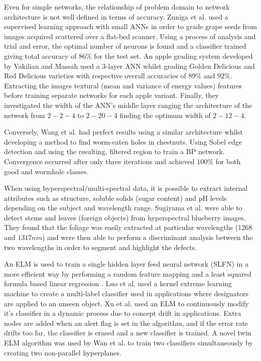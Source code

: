 \documentclass[fleqn,twoside,12pt]{report}
\begin{document}
Even for simple networks, the relationship of problem domain to network architecture is not well defined in terms of accuracy. Zuniga et al.\cite{zuniga} used a supervised learning approach with small ANNs in order to grade grape seeds from images acquired scattered over a flat-bed scanner. Using a process of analysis and trial and error, the optimal number of neurons is found and a classifier trained giving total accuracy of $86\%$ for the test set. An apple grading system developed by Vakilian and Massah \cite{vakilian} used a 3-layer ANN whilst grading Golden Delicious and Red Delicious varieties with respective overall accuracies of $89\%$ and $92\%$. Extracting the images textural (mean and variance of energy values) features before training separate networks for each apple variant. Finally, they investigated the width of the ANN's middle layer ranging the architecture of the network from $2-2-4$ to $2-20-4$ finding the optimum width of $2-12-4$. 

Conversely, Wang et al.\cite{wang} had perfect results using a similar architecture whilst developing a method to find worm-eaten holes in chestnuts. Using Sobel edge detection and using the resulting, filtered region to train a BP network. Convergence occurred after only three iterations and achieved $100\%$ for both good and wormhole classes.

When using hyperspectral/multi-spectral data, it is possible to extract internal attributes such as structure, soluble solids (sugar content) and pH levels depending on the subject and wavelength range. Sugiyama et al.\cite{sugiyama} were able to detect stems and leaves (foreign objects) from hyperspectral blueberry images. They found that the foliage was easily extracted at particular wavelengths (1268 and $1317nm$) and were then able to perform a discriminant analysis between the two wavelengths in order to segment and highlight the defects.

An ELM is used to train a single hidden layer feed neural network (SLFN) in a more efficient way by performing a random feature mapping and a least squared formula based linear regression \cite{peng}. Luo et al.\cite{luo} used a kernel extreme learning machine to create a multi-label classifier used in applications where designators are applied to an unseen object. Xu et al.\cite{xu} used an ELM to continuously modify it's classifier in a dynamic process due to concept drift in applications. Extra nodes are added when an alert flag is set in the algorithm, and if the error rate drifts too far, the classifier is erased and a new classifier is trained. A novel twin ELM algorithm was used by Wan et al.\cite{wan} to train two classifiers simultaneously by creating two non-parallel hyperplanes. 
\end{document}
